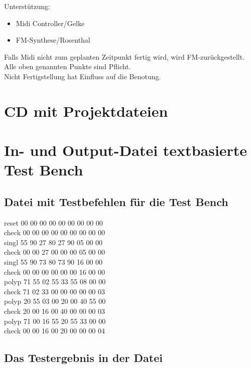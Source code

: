 Unterstützung:

\begin{itemize}
\item Midi Controller/Gelke
\item FM-Synthese/Rosenthal
\end{itemize} 

Falls Midi nicht zum geplanten Zeitpunkt fertig wird, wird FM-zurückgestellt. Alle oben genannten Punkte sind Pflicht.\\
Nicht Fertigstellung hat Einfluss auf die Benotung.



\chapter{CD mit Projektdateien}\label{sect.anhang_cd}

\chapter{In- und Output-Datei textbasierte Test Bench}\label{chap.anhang_midi_input}

\section*{Datei mit Testbefehlen für die Test Bench}

reset 00 00 00 00 00 00 00 00 00\\
check 00 00 00 00 00 00 00 00 00\\
singl 55 90 27 80 27 90 05 00 00\\
check 00 00 27 00 00 00 05 00 00\\
singl 55 90 73 80 73 90 16 00 00\\
check 00 00 00 00 00 00 16 00 00\\
polyp 71 55 02 55 33 55 08 00 00\\
check 71 02 33 00 00 00 00 00 03\\
polyp 20 55 03 00 20 00 40 55 00\\
check 20 00 16 00 40 00 00 00 03\\
polyp 71 00 16 55 20 55 33 00 00\\
check 00 00 16 00 20 00 00 00 04\\

\section*{Das Testergebnis in der Datei}

